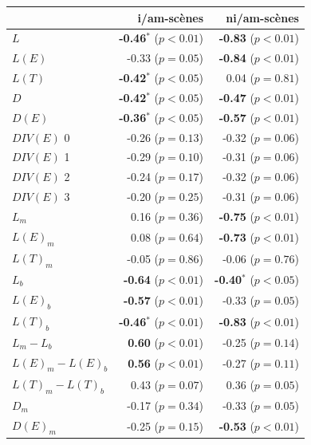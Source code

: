 \begin{table}[t]
\centering
\begin{tabular}{l r r} 
                   &   i/am-scènes                   & ni/am-scènes \\
\hline
$L$                & \textbf{-0.46$^{*}$} ($p<0.01$) & \textbf{-0.83} ($p<0.01$)\\
$L(E)$             & -0.33 ($p=0.05$)                & \textbf{-0.84} ($p<0.01$)\\
$L(T)$             & \textbf{-0.42$^{*}$} ($p<0.05$) &  0.04 ($p=0.81$) \\
$D$                & \textbf{-0.42$^{*}$} ($p<0.05$) & \textbf{-0.47} ($p<0.01$)\\
$D(E)$             & \textbf{-0.36$^{*}$} ($p<0.05$) & \textbf{-0.57} ($p<0.01$)\\
$DIV(E)$ 0         & -0.26 ($p=0.13$)                & -0.32 ($p=0.06$)\\
$DIV(E)$ 1         & -0.29 ($p=0.10$)                & -0.31 ($p=0.06$)\\
$DIV(E)$ 2         & -0.24 ($p=0.17$)                & -0.32 ($p=0.06$)\\
$DIV(E)$ 3         & -0.20 ($p=0.25$)                & -0.31 ($p=0.06$)\\
$L_m$              & 0.16  ($p=0.36$)                & \textbf{-0.75} ($p<0.01$) \\
$L(E)_m$           & 0.08  ($p=0.64$)                & \textbf{-0.73} ($p<0.01$) \\
$L(T)_m$           & -0.05 ($p=0.86$)                & -0.06 ($p=0.76$) \\
$L_b$              & \textbf{-0.64} ($p<0.01$)       & \textbf{-0.40$^{*}$} ($p<0.05$) \\
$L(E)_b$           & \textbf{-0.57} ($p<0.01$)       & -0.33 ($p=0.05$) \\
$L(T)_b$           & \textbf{-0.46$^{*}$} ($p<0.01$) & \textbf{-0.83} ($p<0.01$) \\
$L_m-L_b$          & \textbf{0.60} ($p<0.01$)        & -0.25 ($p=0.14$) \\
$L(E)_m-L(E)_b$    & \textbf{0.56} ($p<0.01$)        & -0.27 ($p=0.11$) \\
$L(T)_m-L(T)_b$    & 0.43 ($p=0.07$)                 & 0.36 ($p=0.05$) \\
$D_m$              & -0.17 ($p=0.34$)                & -0.33 ($p=0.05$) \\
$D(E)_m$           & -0.25 ($p=0.15$)                & \textbf{-0.53} ($p<0.01$) \\

\end{tabular}
\end{table}
